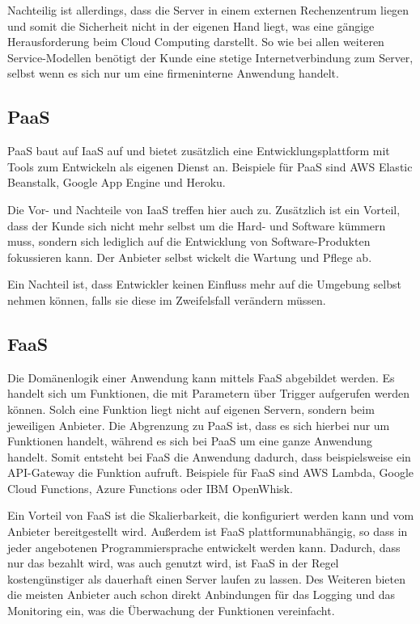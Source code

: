 Nachteilig ist allerdings, dass die Server in einem externen Rechenzentrum liegen und somit die Sicherheit nicht in der eigenen Hand liegt, was eine gängige Herausforderung beim Cloud Computing darstellt. So wie bei allen weiteren Service-Modellen benötigt der Kunde eine stetige Internetverbindung zum Server, selbst wenn es sich nur um eine firmeninterne Anwendung handelt.

\subsection{\acl{PaaS}}

\acf{PaaS} baut auf \acl{IaaS} auf und bietet zusätzlich eine Entwicklungsplattform mit Tools zum Entwickeln als eigenen Dienst an. Beispiele für \ac{PaaS} sind \ac{AWS} Elastic Beanstalk, Google App Engine und Heroku.

Die Vor- und Nachteile von \acl{IaaS} treffen hier auch zu. Zusätzlich ist ein Vorteil, dass der Kunde sich nicht mehr selbst um die Hard- und Software kümmern muss, sondern sich lediglich auf die Entwicklung von Software-Produkten fokussieren kann. Der Anbieter selbst wickelt die Wartung und Pflege ab.

Ein Nachteil ist, dass Entwickler keinen Einfluss mehr auf die Umgebung selbst nehmen können, falls sie diese im Zweifelsfall verändern müssen.

\subsection{\acl{FaaS}}

Die Domänenlogik einer Anwendung kann mittels \acf{FaaS} abgebildet werden. Es handelt sich um Funktionen, die mit Parametern über Trigger aufgerufen werden können. Solch eine Funktion liegt nicht auf eigenen Servern, sondern beim jeweiligen Anbieter. Die Abgrenzung zu \ac{PaaS} ist, dass es sich hierbei nur um Funktionen handelt, während es sich bei \ac{PaaS} um eine ganze Anwendung handelt. Somit entsteht bei \ac{FaaS} die Anwendung dadurch, dass beispielsweise ein \acs{API}-Gateway die Funktion aufruft. Beispiele für \ac{FaaS} sind \ac{AWS} Lambda, Google Cloud Functions, Azure Functions oder IBM OpenWhisk.

Ein Vorteil von \ac{FaaS} ist die Skalierbarkeit, die konfiguriert werden kann und vom Anbieter bereitgestellt wird. Außerdem ist \ac{FaaS} plattformunabhängig, so dass in jeder angebotenen Programmiersprache entwickelt werden kann. Dadurch, dass nur das bezahlt wird, was auch genutzt wird, ist \ac{FaaS} in der Regel kostengünstiger als dauerhaft einen Server laufen zu lassen. Des Weiteren bieten die meisten Anbieter auch schon direkt Anbindungen für das Logging und das Monitoring ein, was die Überwachung der Funktionen vereinfacht.

